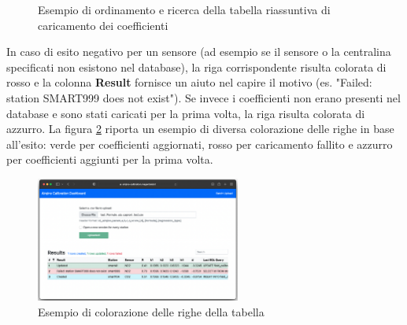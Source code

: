 \begin{figure}[H]%
    \centering
    \captionsetup{justification=centering}
    \caption{Esempio di ordinamento e ricerca della tabella riassuntiva di caricamento dei coefficienti}%
    \label{fig:interfaccia-4-5}%
\end{figure}

In caso di esito negativo per un sensore (ad esempio se il sensore o la centralina specificati non esistono nel database), la riga corrispondente risulta colorata di rosso e la colonna \textbf{Result} fornisce un aiuto nel capire il motivo (es. "Failed: station SMART999 does not exist").
Se invece i coefficienti non erano presenti nel database e sono stati caricati per la prima volta, la riga risulta colorata di azzurro. La figura \ref{fig:interfaccia-7} riporta un esempio di diversa colorazione delle righe in base all'esito: verde per coefficienti aggiornati, rosso per caricamento fallito e azzurro per coefficienti aggiunti per la prima volta.

\vspace{2mm}
\begin{figure}[H]
\centering
\includegraphics[width=0.60\textwidth,height=\textheight,keepaspectratio]{img/interfaccia_7}
\caption{Esempio di colorazione delle righe della tabella}
\label{fig:interfaccia-7}
\end{figure}


